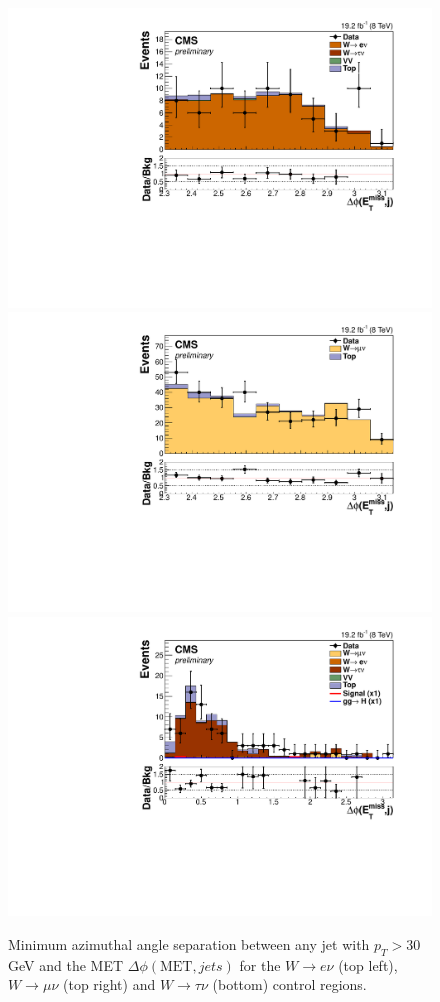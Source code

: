 \begin{figure}[!htp]
\centering
\includegraphics[width=.49\textwidth]{Chapter07/Images/output_sigreg/enu_alljetsmetnomu_mindphi.pdf}
\includegraphics[width=.49\textwidth]{Chapter07/Images/output_sigreg/munu_alljetsmetnomu_mindphi.pdf} \\
\includegraphics[width=.49\textwidth]{Chapter07/Images/output_sigreg/taunu_alljetsmetnomu_mindphi.pdf}
\caption{Minimum azimuthal angle separation between any jet with $p_{T}>30$ GeV and the \gls{MET} $\Delta\phi(\text{MET},jets)$ for the $W\rightarrow e\nu$ (top left), $W\rightarrow\mu\nu$ (top right) and $W\rightarrow\tau\nu$ (bottom) control regions.}
\label{fig:wmindphicontplots}
\end{figure}
 

